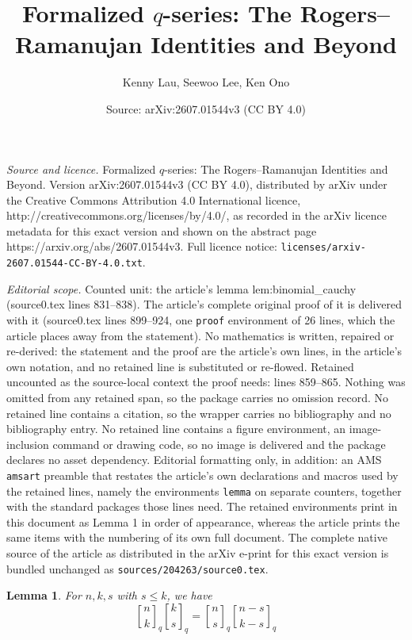 \documentclass[10pt,a4paper]{amsart}
\title{Formalized $q$-series: The Rogers--Ramanujan Identities and Beyond}
\author{Kenny Lau, Seewoo Lee, Ken Ono}
\date{Source: arXiv:2607.01544v3 (CC BY 4.0)}
\newtheorem{lemma}{Lemma}
\newcommand{\qbin}[2]{\genfrac{[}{]}{0pt}{}{#1}{#2}_{q}}
\begin{document}
\maketitle

\noindent\emph{Source and licence.} Formalized $q$-series: The Rogers--Ramanujan Identities and Beyond. Version arXiv:2607.01544v3 (CC BY 4.0), distributed by arXiv under the Creative Commons Attribution 4.0 International licence, http://creativecommons.org/licenses/by/4.0/, as recorded in the arXiv licence metadata for this exact version and shown on the abstract page https://arxiv.org/abs/2607.01544v3. Full licence notice: \texttt{licenses/arxiv-2607.01544-CC-BY-4.0.txt}.\par\smallskip

\noindent\textit{Editorial scope.} Counted unit: the article's lemma lem:binomial\_cauchy (source0.tex lines 831--838). The article's complete original proof of it is delivered with it (source0.tex lines 899--924, one \texttt{proof} environment of 26 lines, which the article places away from the statement). No mathematics is written, repaired or re-derived: the statement and the proof are the article's own lines, in the article's own notation, and no retained line is substituted or re-flowed.  Retained uncounted as the source-local context the proof needs: lines 859--865.  Nothing was omitted from any retained span, so the package carries no omission record.  No retained line contains a citation, so the wrapper carries no bibliography and no bibliography entry.  No retained line contains a figure environment, an image-inclusion command or drawing code, so no image is delivered and the package declares no asset dependency.  Editorial formatting only, in addition: an AMS \texttt{amsart} preamble that restates the article's own declarations and macros used by the retained lines, namely the environments \texttt{lemma} on separate counters, together with the standard packages those lines need.  The retained environments print in this document as Lemma 1 in order of appearance, whereas the article prints the same items with the numbering of its own full document.  The complete native source of the article as distributed in the arXiv e-print for this exact version is bundled unchanged as \texttt{sources/204263/source0.tex}.
\begin{lemma}
    \label{lem:binomial_mul}
    For $n, k, s$ with $s \le k$, we have
    \begin{equation}
        \qbin{n}{k} \qbin{k}{s} = \qbin{n}{s} \qbin{n-s}{k-s}
    \end{equation}
\end{lemma}
\end{document}
